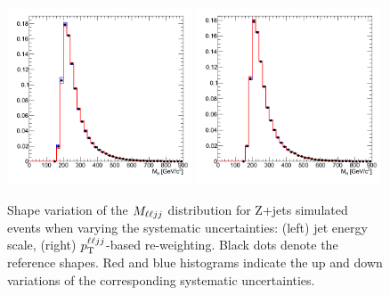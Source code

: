 \begin{figure}[htb]
\begin{center}
\centerline{
\includegraphics[width=0.49\textwidth]{plots/dy_jse.png}
\includegraphics[width=0.49\textwidth]{plots/dy_pthe.png}
}
\caption{Shape variation of the $M_{\ell\ell jj}$ distribution for Z+jets simulated
events when varying the systematic uncertainties: (left) jet energy scale,
(right) $p_{\mathrm{T}}^{\ell\ell jj}$-based re-weighting. Black dots denote
the reference shapes. Red and blue histograms indicate the up and down variations
of the corresponding systematic uncertainties.
}
\label{fig:sysshape}
\end{center}
\end{figure}

